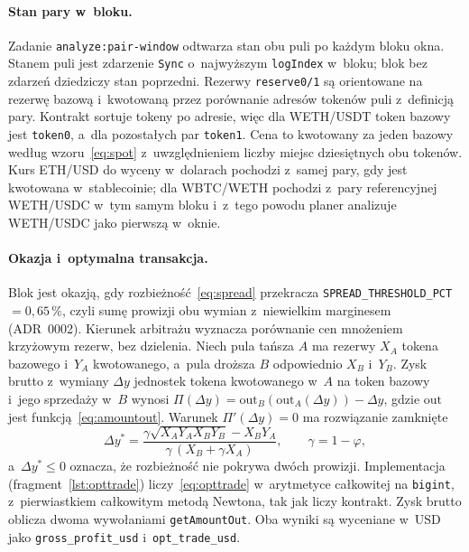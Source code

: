\paragraph{Stan pary w~bloku.} Zadanie \texttt{analyze:pair-window} odtwarza stan obu puli po
każdym bloku okna. Stanem puli jest zdarzenie \texttt{Sync} o~najwyższym \texttt{logIndex}
w~bloku; blok bez zdarzeń dziedziczy stan poprzedni. Rezerwy \texttt{reserve0/1} są orientowane
na rezerwę bazową i~kwotowaną przez porównanie adresów tokenów puli z~definicją pary. Kontrakt
sortuje tokeny po adresie, więc dla WETH/USDT token bazowy jest \texttt{token0}, a~dla
pozostałych par \texttt{token1}. Cena to kwotowany za jeden bazowy według wzoru~\eqref{eq:spot}
z~uwzględnieniem liczby miejsc dziesiętnych obu tokenów. Kurs ETH/USD do wyceny w~dolarach
pochodzi z~samej pary, gdy jest kwotowana w~stablecoinie; dla WBTC/WETH pochodzi z~pary
referencyjnej WETH/USDC w~tym samym bloku i~z~tego powodu planer analizuje WETH/USDC jako
pierwszą w~oknie.

\paragraph{Okazja i~optymalna transakcja.} Blok jest okazją, gdy rozbieżność~\eqref{eq:spread}
przekracza \texttt{SPREAD\_THRESHOLD\_PCT} $=0{,}65\,\%$, czyli sumę prowizji obu wymian
z~niewielkim marginesem (ADR~0002). Kierunek arbitrażu wyznacza porównanie cen mnożeniem
krzyżowym rezerw, bez dzielenia. Niech pula tańsza $A$ ma rezerwy $X_A$ tokena bazowego i~$Y_A$
kwotowanego, a~pula droższa $B$ odpowiednio $X_B$ i~$Y_B$. Zysk brutto z~wymiany $\Delta y$
jednostek tokena kwotowanego w~$A$ na token bazowy i~jego sprzedaży w~$B$ wynosi
$\Pi(\Delta y) = \mathrm{out}_B(\mathrm{out}_A(\Delta y)) - \Delta y$, gdzie $\mathrm{out}$ jest
funkcją~\eqref{eq:amountout}. Warunek $\Pi'(\Delta y)=0$ ma rozwiązanie zamknięte
\begin{equation}
  \Delta y^{*} = \frac{\gamma\sqrt{X_A Y_A X_B Y_B} - X_B Y_A}{\gamma\,(X_B + \gamma X_A)},
  \qquad \gamma = 1-\varphi ,
  \label{eq:opttrade}
\end{equation}
a~$\Delta y^{*}\le 0$ oznacza, że rozbieżność nie pokrywa dwóch prowizji. Implementacja
(fragment~\ref{lst:opttrade}) liczy~\eqref{eq:opttrade} w~arytmetyce całkowitej na
\texttt{bigint}, z~pierwiastkiem całkowitym metodą Newtona, tak jak liczy kontrakt. Zysk brutto
oblicza dwoma wywołaniami \texttt{getAmountOut}. Oba wyniki są wyceniane w~USD jako
\texttt{gross\_profit\_usd} i~\texttt{opt\_trade\_usd}.

